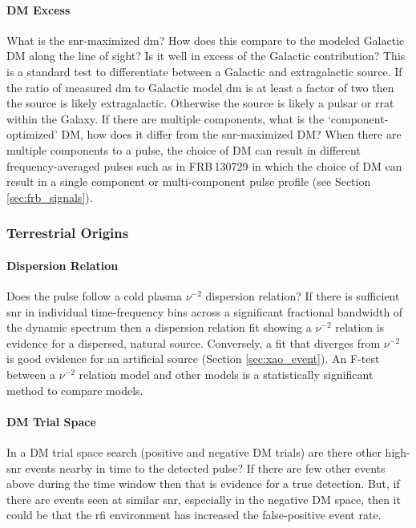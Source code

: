 \documentclass[a4paper,fleqn,usenatbib]{mnras}
\begin{document}
\paragraph{DM Excess}

What is the \gls{snr}-maximized \gls{dm}? How does this compare to the modeled
Galactic DM along the line of sight? Is it well in excess of the Galactic
contribution? This is a standard test to differentiate between a Galactic and
extragalactic source. If the ratio of measured \gls{dm} to Galactic model
\gls{dm} is at least a factor of two then the source is likely extragalactic.
Otherwise the source is likely a pulsar or \gls{rrat} within the Galaxy.  If
there are multiple components, what is the `component-optimized' DM, how does it
differ from the \gls{snr}-maximized DM? When there are multiple components to a
pulse, the choice of DM can result in different frequency-averaged pulses such
as in FRB\,130729 in which the choice of DM can result in a single component or
multi-component pulse profile (see Section \ref{sec:frb_signals}).

\subsubsection{Terrestrial Origins}

\paragraph{Dispersion Relation}

Does the pulse follow a cold plasma $\nu^{-2}$ dispersion relation? If there is
sufficient \gls{snr} in individual time-frequency bins across a significant
fractional bandwidth of the dynamic spectrum then a dispersion relation fit
showing a $\nu^{-2}$ relation is evidence for a dispersed, natural source.
Conversely, a fit that diverges from $\nu^{-2}$ is good evidence for an
artificial source (Section \ref{sec:xao_event}). An F-test between a $\nu^{-2}$
relation model and other models is a statistically significant method to compare
models.

\paragraph{DM Trial Space}

In a DM trial space search (positive and negative DM trials) are there other
high-\gls{snr} events nearby in time to the detected pulse? If there are few
other events above during the time window then that is evidence for a true
detection. But, if there are events seen at similar \gls{snr}, especially in the
negative DM space, then it could be that the \gls{rfi} environment has
increased the false-positive event rate.
\end{document}
